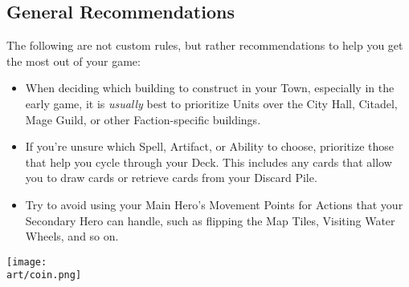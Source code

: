 \begin{multicols}{2}

\subsection*{General Recommendations}

The following are not custom rules, but rather recommendations to help you get the most out of your game:

\begin{itemize}
  \item When deciding which building to construct in your Town, especially in the early game, it is \textit{usually} best to prioritize Units over the City Hall, Citadel, Mage Guild, or other Faction-specific buildings.
  \item If you're unsure which Spell, Artifact, or Ability to choose, prioritize those that help you cycle through your Deck.
    This includes any cards that allow you to draw cards or retrieve cards from your Discard Pile.
  \item Try to avoid using your Main Hero's Movement Points for Actions that your Secondary Hero can handle, such as flipping the Map Tiles, Visiting Water Wheels, and so on.
\end{itemize}

\begin{center}
  \texttt{[image: \\art/coin.png]}
\end{center}

\end{multicols}
